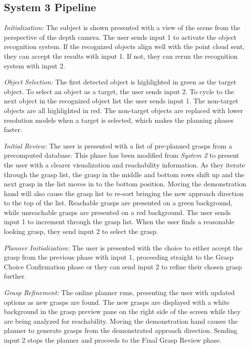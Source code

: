 \subsection{System 3 Pipeline}
\label{section:pipeline-v3}
\emph{Initialization:} The subject is shown presented with a view of the scene from the perspective of the depth camera. The user sends input 1 to activate the object recognition system. If the recognized objects align well with the point cloud sent, they can accept the results with input 1. If not, they can rerun the recognition system with input 2.

\emph{Object Selection:} The first detected object is highlighted in green as the target object. To select an object as a target, the user sends input 2. To cycle to the next object in the recognized object list the user sends input 1. The non-target objects are all highlighted in red. The non-target objects are replaced with lower resolution models when a target is selected, which makes the planning phases faster. 

\emph{Initial Review:} The user is presented with a list of pre-planned grasps from a precomputed database. This phase has been modified from \emph{System 2} to present the user with a clearer visualization and reachability information. As they iterate through the grasp list, the grasp in the middle and bottom rows shift up and the next grasp in the list moves in to the bottom position. Moving the demonstration hand will also cause the grasp list to re-sort bringing the new approach direction to the top of the list. Reachable grasps are presented on a green background, while unreachable grasps are presented on a red background. The user sends input 1 to increment through the grasp list. When the user finds a reasonable looking grasp, they send input 2 to select the grasp.

\emph{Planner Initialization:} The user is presented with the choice to either accept the grasp from the previous phase with input 1, proceeding straight to the Grasp Choice Confirmation phase or they can send input 2 to refine their chosen grasp further.

\emph{Grasp Refinement:} The online planner runs, presenting the user with updated options as new grasps are found. The new grasps are displayed with a white background in the grasp preview pane on the right side of the screen while they are being analyzed for reachability. Moving the demonstration hand causes the planner to generate grasps from the demonstrated approach direction. Sending input 2 stops the planner and proceeds to the Final Grasp Review phase.


